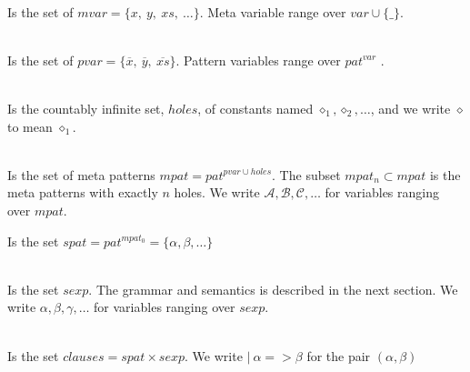
\begin{definition} \ \\
  Is the set of $mvar = \{x,\ y,\ xs,\ \ldots \}$. Meta variable range
  over $var \cup \{\texttt{_}\}$.
\end{definition}

\begin{definition} \ \\
  Is the set of $pvar = \{ \overline{x},\ \overline{y},\
  \overline{xs} \}$. Pattern variables range over $pat^{var}$ .
\end{definition}

\begin{definition}[Holes] \ \\
  Is the countably infinite set, $holes$, of constants named $\diamond_1, \diamond_2,
  \ldots$, and we write $\diamond$ to mean $\diamond_1$.
\end{definition}

\begin{definition} \ \\
  Is the set of meta patterns $mpat = pat^{pvar \cup holes}$. The subset $mpat_n
  \subset mpat$ is the meta patterns with exactly $n$ holes. We write
  $\mathcal{A},\mathcal{B}, \mathcal{C}, \ldots$ for variables ranging over
  $mpat$.
\end{definition}

\begin{definition}
  Is the set $spat = pat^{mpat_0} = \{\alpha, \beta, \ldots \}$
\end{definition}

\begin{definition} \ \\
  Is the set $sexp$. The grammar and semantics is described in the next
  section. We write $\alpha, \beta, \gamma, \ldots$ for variables ranging over
  $sexp$.
\end{definition}

\begin{definition} \ \\
  Is the set $clauses = spat \times sexp$. We write $|\ \alpha => \beta$ for the pair
  $(\alpha, \beta)$
\end{definition}

